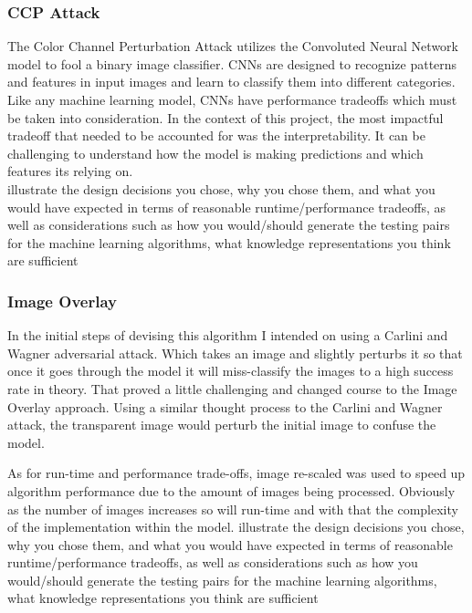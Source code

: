 \documentclass{article}
\begin{document}
\subsubsection{CCP Attack}

The Color Channel Perturbation Attack utilizes the Convoluted Neural Network model to fool a binary image classifier. CNNs are designed to recognize patterns and features in input images and learn to classify them into different categories. Like any machine learning model, CNNs have performance tradeoffs which must be taken into consideration. In the context of this project, the most impactful tradeoff that needed to be accounted for was the interpretability. It can be challenging to understand how the model is making predictions and which features its relying on. 
\\

illustrate the design decisions you chose, why you chose them, and what you would have expected in terms of reasonable runtime/performance tradeoffs, as well as considerations such as how you would/should generate the testing pairs for the machine learning algorithms, what knowledge representations you think are sufficient 


\subsubsection{Image Overlay}

In the initial steps of devising this algorithm I intended on using a Carlini and Wagner adversarial attack. Which takes an image and slightly perturbs it so that once it goes through the model it will miss-classify the images to a high success rate in theory. That proved a little challenging and changed course to the Image Overlay approach. Using a similar thought process to the Carlini and Wagner attack, the transparent image would perturb the initial image to confuse the model.

As for run-time and performance trade-offs, image re-scaled was used to speed up algorithm performance due to the amount of images being processed. Obviously as the number of images increases so will run-time and with that the complexity of the implementation within the model. 
illustrate the design decisions you chose, why you chose them, and what you would have expected in terms of reasonable runtime/performance tradeoffs, as well as considerations such as how you would/should generate the testing pairs for the machine learning algorithms, what knowledge representations you think are sufficient 
\end{document}

